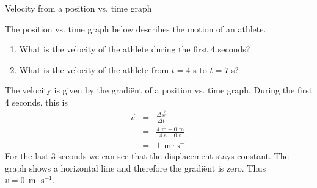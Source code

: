 \begin{wex}{Velocity from a position vs. time graph}{The position vs. time graph below describes the motion of an athlete.\\
\begin{center}
\end{center}\begin{enumerate}[label=\textbf{\arabic*}.]
\item What is the velocity of the athlete during the first 4 seconds?
\item What is the velocity of the athlete from $t=4$ s to $t=7$ s?
\end{enumerate}}
{
The velocity is given by the gradi\"ent of a position vs. time graph. During the first 4 seconds, this is
\begin{eqnarray*}
\vec{v}&=&\frac{\Delta \vec{x}}{\Delta t}\\
&=&\frac{4\text{~m} - 0\text{~m}}{4\text{~s} - 0\text{~s}}\\
&=&1\ ~\text{m}\cdot \text{s}^{-1}
\end{eqnarray*}
For the last 3 seconds we can see that the displacement stays constant. The graph shows a horizontal line and therefore the gradi\"ent is zero. Thus ${v}=0\ ~\text{m}\cdot \text{s}^{-1}$.}
\end{wex} 
    \noindent 
